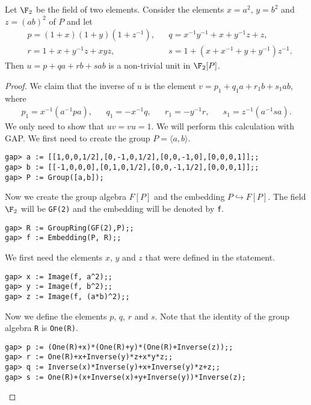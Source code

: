 \begin{theorem}[Gardam]
\label{thm:Gardam}
    Let $\F_2$ be the field of two elements. Consider the elements 
    $x=a^2$, $y=b^2$ and $z=(ab)^2$ of $P$ and let 
    \begin{align*}
        &p=(1+x)(1+y)(1+z^{-1}), 
        &&q = x^{-1}y^{-1}+x+y^{-1}z+z,\\
        &r = 1+x+y^{-1}z+xyz,
        &&s=1+(x+x^{-1}+y+y^{-1})z^{-1}.
    \end{align*}
    Then $u=p+qa+rb+sab$ is a non-trivial unit in $\F_2[P]$. 
\end{theorem}

\begin{proof}
    We claim that the inverse of $u$ 
    is the element $v=p_1+q_1a+r_1b+s_1ab$, where
    \begin{align*}
        p_1=x^{-1}(a^{-1}pa), 
        && q_1=-x^{-1}q,
        && r_1=-y^{-1}r,
        && s_1=z^{-1}(a^{-1}sa).
    \end{align*}
    We only need to show that $uv=vu=1$. We will perform this
    calculation with \textsf{GAP}. 
    We first need to create the group $P=\langle a,b\rangle$. 
\begin{lstlisting} 
gap> a := [[1,0,0,1/2],[0,-1,0,1/2],[0,0,-1,0],[0,0,0,1]];;
gap> b := [[-1,0,0,0],[0,1,0,1/2],[0,0,-1,1/2],[0,0,0,1]];;
gap> P := Group([a,b]);
\end{lstlisting}
    Now we create the group algebra $F[P]$ and 
    the embedding $P\hookrightarrow F[P]$.  
    The field $\F_2$ will be \lstinline{GF(2)} 
    and the embedding will be denoted by \lstinline{f}. 
\begin{lstlisting}
gap> R := GroupRing(GF(2),P);;
gap> f := Embedding(P, R);;
\end{lstlisting}
    We first need the elements $x$, $y$ and $z$ that were defined in the
    statement.
\begin{lstlisting}
gap> x := Image(f, a^2);;
gap> y := Image(f, b^2);;
gap> z := Image(f, (a*b)^2);;
\end{lstlisting}
    Now we define the elements $p$, $q$, $r$ and $s$. Note that
    the identity of the group algebra \lstinline{R} 
    is \lstinline{One(R)}. 
\begin{lstlisting}
gap> p := (One(R)+x)*(One(R)+y)*(One(R)+Inverse(z));;
gap> r := One(R)+x+Inverse(y)*z+x*y*z;;
gap> q := Inverse(x)*Inverse(y)+x+Inverse(y)*z+z;;
gap> s := One(R)+(x+Inverse(x)+y+Inverse(y))*Inverse(z);
\end{lstlisting}

\end{proof}
